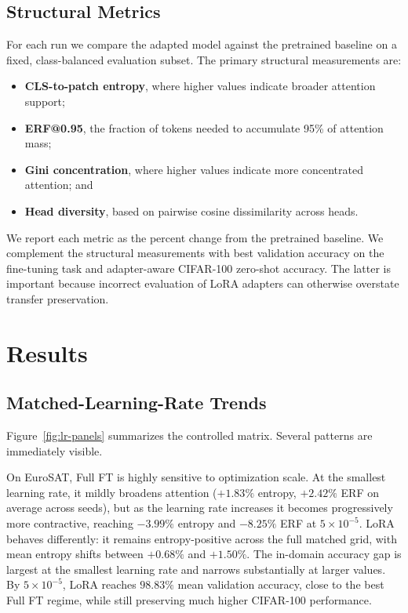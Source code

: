 \documentclass[10pt]{article}
\begin{document}
\subsection{Structural Metrics}
For each run we compare the adapted model against the pretrained baseline on a fixed, class-balanced evaluation subset. The primary structural measurements are:
\begin{itemize}
    \item \textbf{CLS-to-patch entropy}, where higher values indicate broader attention support;
    \item \textbf{ERF@0.95}, the fraction of tokens needed to accumulate 95\% of attention mass;
    \item \textbf{Gini concentration}, where higher values indicate more concentrated attention; and
    \item \textbf{Head diversity}, based on pairwise cosine dissimilarity across heads.
\end{itemize}

We report each metric as the percent change from the pretrained baseline. We complement the structural measurements with best validation accuracy on the fine-tuning task and adapter-aware CIFAR-100 zero-shot accuracy. The latter is important because incorrect evaluation of LoRA adapters can otherwise overstate transfer preservation.

\section{Results}
\subsection{Matched-Learning-Rate Trends}
Figure~\ref{fig:lr-panels} summarizes the controlled matrix. Several patterns are immediately visible.

On EuroSAT, Full FT is highly sensitive to optimization scale. At the smallest learning rate, it mildly broadens attention ($+1.83\%$ entropy, $+2.42\%$ ERF on average across seeds), but as the learning rate increases it becomes progressively more contractive, reaching $-3.99\%$ entropy and $-8.25\%$ ERF at $5{\times}10^{-5}$. LoRA behaves differently: it remains entropy-positive across the full matched grid, with mean entropy shifts between $+0.68\%$ and $+1.50\%$. The in-domain accuracy gap is largest at the smallest learning rate and narrows substantially at larger values. By $5{\times}10^{-5}$, LoRA reaches $98.83\%$ mean validation accuracy, close to the best Full FT regime, while still preserving much higher CIFAR-100 performance.
\end{document}
